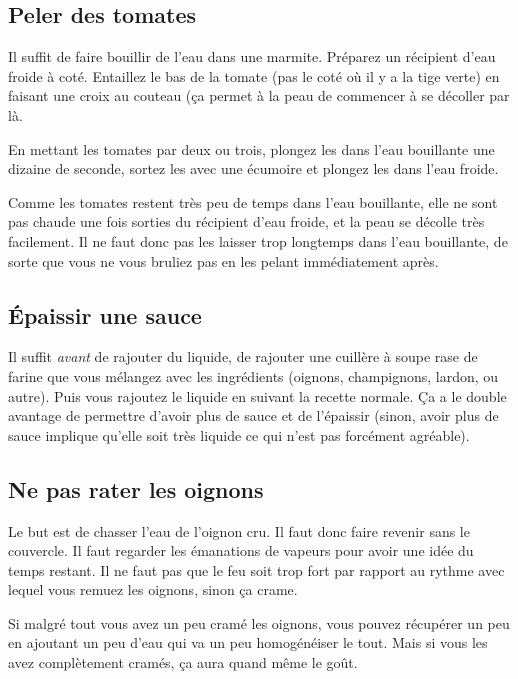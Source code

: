 \documentclass[a4paper,twoside]{report}
\begin{document}
\subsection{Peler des tomates}\label{sec:peler_tomate}
Il suffit de faire bouillir de l'eau dans une marmite. Préparez un récipient d'eau froide à coté.
Entaillez le bas de la tomate (pas le coté où il y a la tige verte) en faisant une croix au couteau (ça permet à la peau de commencer à se décoller par là. 

En mettant les tomates par deux ou trois, plongez les dans l'eau bouillante une dizaine de seconde, sortez les avec une écumoire et plongez les dans l'eau froide. 

\begin{remarque}
Comme les tomates restent très peu de temps dans l'eau bouillante, elle ne sont pas chaude une fois sorties du récipient d'eau froide, et la peau se décolle très facilement. Il ne faut donc pas les laisser trop longtemps dans l'eau bouillante, de sorte que vous ne vous bruliez pas en les pelant immédiatement après.
\end{remarque}



\subsection{Épaissir une sauce}
Il suffit \emph{avant} de rajouter du liquide, de rajouter une cuillère à soupe rase de farine que vous mélangez avec les ingrédients (oignons, champignons, lardon, ou autre). Puis vous rajoutez le liquide en suivant la recette normale. Ça a le double avantage de permettre d'avoir plus de sauce et de l'épaissir (sinon, avoir plus de sauce implique qu'elle soit très liquide ce qui n'est pas forcément agréable).

\subsection{Ne pas rater les oignons}
Le but est de chasser l'eau de l'oignon cru. Il faut donc faire revenir sans le couvercle. Il faut regarder les émanations de vapeurs pour avoir une idée du temps restant. Il ne faut pas que le feu soit trop fort par rapport au rythme avec lequel vous remuez les oignons, sinon ça crame. 

Si malgré tout vous avez un peu cramé les oignons, vous pouvez récupérer un peu en ajoutant un peu d'eau qui va un peu homogénéiser le tout. Mais si vous les avez complètement cramés, ça aura quand même le goût.
\end{document}
